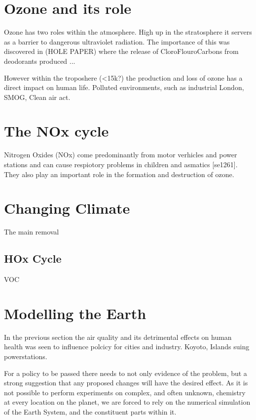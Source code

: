 \section{Ozone and its role}
Ozone has two roles within the atmosphere. High up in the stratosphere it servers as a barrier to dangerous ultraviolet radiation. The importance of this was discovered in (HOLE PAPER) where the release of CloroFlouroCarbons from deodorants produced ...

However within the troposhere (<15k?) the production and loss of ozone has a direct impact on human life. Polluted environments, such as industrial London,
SMOG, Clean air act. 



\section{The NOx cycle}
Nitrogen Oxides (NOx) come predominantly from motor verhicles and power stations and can cause respiotory problems in children and asmatics [se1261]. They also play an important role in the formation and destruction of ozone.



\section{Changing Climate}



The main removal

\subsection{HOx Cycle}








VOC


\section{Modelling the Earth}
In the previous section the air quality and its detrimental effects on human health was seen to influence polcicy for cities and industry. Koyoto, Islands suing powerstations.

For a policy to be passed there needs to not only evidence of the problem, but a strong suggestion that any proposed changes will have the desired effect. As it is not possible to perform experiments on complex, and often unknown, chemistry at every location on the planet, we are forced to rely on the numerical simulation of the Earth System, and the constituent parts within it.

